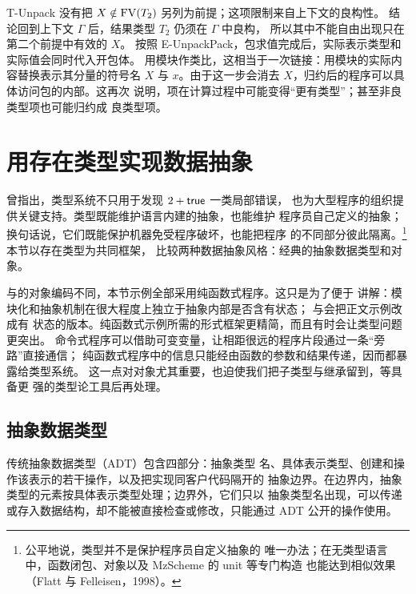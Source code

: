 T-Unpack 没有把 \(X\notin\operatorname{FV}(T_2)\) 另列为前提；这项限制来自上下文的良构性。
结论回到上下文 \(\Gamma\) 后，结果类型 \(T_2\) 仍须在 \(\Gamma\) 中良构，
所以其中不能自由出现只在第二个前提中有效的 \(X\)。
按照 E-UnpackPack，包求值完成后，实际表示类型和实际值会同时代入开包体。
用模块作类比，这相当于一次链接：用模块的实际内容替换表示其分量的符号名
\(X\) 与 \(x\)。由于这一步会消去 \(X\)，归约后的程序可以具体访问包的内部。这再次
说明，项在计算过程中可能变得“更有类型”；甚至非良类型项也可能归约成
良类型项。

\section{用存在类型实现数据抽象}
\label{sec:24.2}

曾指出，类型系统不只用于发现 \(2+\mathsf{true}\) 一类局部错误，
也为大型程序的组织提供关键支持。类型既能维护语言内建的抽象，也能维护
程序员自己定义的抽象；换句话说，它们既能保护机器免受程序破坏，也能把程序
的不同部分彼此隔离。\footnote{公平地说，类型并不是保护程序员自定义抽象的
唯一办法；在无类型语言中，函数闭包、对象以及 MzScheme 的 unit 等专门构造
也能达到相似效果（Flatt 与 Felleisen，1998）。}本节以存在类型为共同框架，
比较两种数据抽象风格：经典的抽象数据类型和对象。

与的对象编码不同，本节示例全部采用纯函数式程序。这只是为了便于
讲解：模块化和抽象机制在很大程度上独立于抽象内部是否含有状态；
与会把正文示例改成有
状态的版本。纯函数式示例所需的形式框架更精简，而且有时会让类型问题更突出。
命令式程序可以借助可变变量，让相距很远的程序片段通过一条“旁路”直接通信；
纯函数式程序中的信息只能经由函数的参数和结果传递，因而都暴露给类型系统。
这一点对对象尤其重要，也迫使我们把子类型与继承留到，等具备更
强的类型论工具后再处理。

\subsection*{抽象数据类型}

传统抽象数据类型（ADT）包含四部分：抽象类型
名、具体表示类型、创建和操作该表示的若干操作，以及把实现同客户代码隔开的
抽象边界。在边界内，抽象类型的元素按具体表示类型处理；边界外，它们只以
抽象类型名出现，可以传递或存入数据结构，却不能被直接检查或修改，只能通过
ADT 公开的操作使用。

